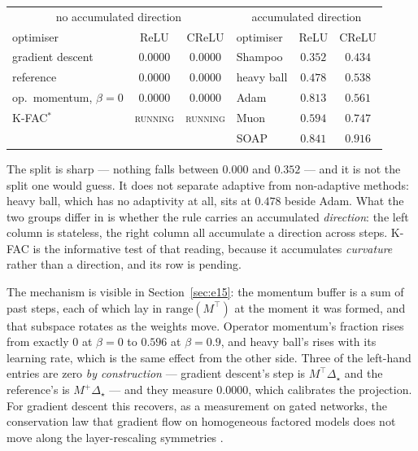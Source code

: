 \documentclass{article} %
\theoremstyle{plain}
\theoremstyle{definition}
\theoremstyle{remark}
\newcommand{\RUNNING}{{\footnotesize\textsc{running}}}
\begin{document}
\begin{center}\small
\begin{tabular}{lcc|lcc}
\toprule
\multicolumn{3}{c|}{no accumulated direction} & \multicolumn{3}{c}{accumulated direction} \\
optimiser & ReLU & CReLU & optimiser & ReLU & CReLU \\
\midrule
gradient descent & $0.0000$ & $0.0000$ & Shampoo    & $0.352$ & $0.434$ \\
reference        & $0.0000$ & $0.0000$ & heavy ball & $0.478$ & $0.538$ \\
op.\ momentum, $\beta=0$ & $0.0000$ & $0.0000$ & Adam & $0.813$ & $0.561$ \\
K-FAC$^{\ast}$   & \RUNNING & \RUNNING & Muon       & $0.594$ & $0.747$ \\
                 &          &          & SOAP       & $0.841$ & $0.916$ \\
\bottomrule
\end{tabular}
\end{center}

\noindent The split is sharp --- nothing falls between $0.000$ and $0.352$ --- and it is not the
split one would guess. It does not separate adaptive from non-adaptive methods: heavy ball, which
has no adaptivity at all, sits at $0.478$ beside Adam. What the two groups differ in is whether the
rule carries an accumulated \emph{direction}: the left column is stateless, the right column all
accumulate a direction across steps. K-FAC is the informative test of that reading, because it
accumulates \emph{curvature} rather than a direction, and its row is pending.

The mechanism is visible in Section~\ref{sec:e15}: the momentum buffer is a sum of past steps, each
of which lay in $\mathrm{range}(M^\top)$ at the moment it was formed, and that subspace rotates as
the weights move. Operator momentum's fraction rises from exactly $0$ at $\beta = 0$ to $0.596$ at
$\beta = 0.9$, and heavy ball's rises with its learning rate, which is the same effect from the
other side. Three of the left-hand entries are zero \emph{by construction} --- gradient descent's
step is $M^\top\Delta_\star$ and the reference's is $M^{+}\Delta_\star$ --- and they measure
$0.0000$, which calibrates the projection. For gradient descent this recovers, as a measurement on
gated networks, the conservation law that gradient flow on homogeneous factored models does not
move along the layer-rescaling symmetries \citep{du2018algorithmic}.
\end{document}
